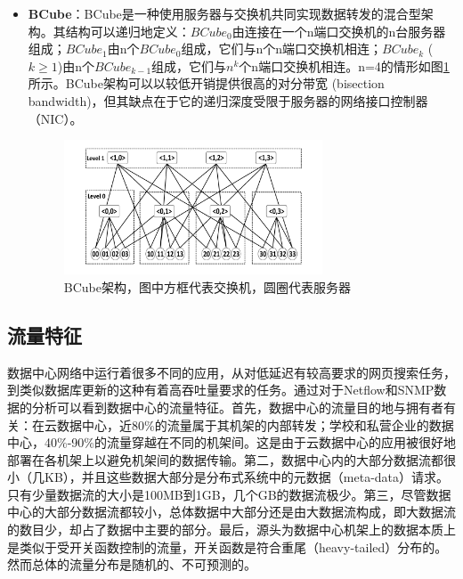 \begin{itemize}
    \item \textbf{BCube}：BCube是一种使用服务器与交换机共同实现数据转发的混合型架构。其结构可以递归地定义：\textit{$BCube_0$}由连接在一个n端口交换机的n台服务器组成；\textit{$BCube_1$}由n个\textit{$BCube_0$}组成，它们与n个n端口交换机相连；\textit{$BCube_k$} ($k \geq 1$)由n个\textit{$BCube_{k-1}$}组成，它们与$n^k$个n端口交换机相连。n=4的情形如图\ref{fig:BCube}所示。BCube架构可以以较低开销提供很高的对分带宽 (bisection bandwidth)，但其缺点在于它的递归深度受限于服务器的网络接口控制器（NIC）。
    \begin{figure}[h]
    \centering
    \includegraphics[height=4cm]{figure/BCube.png}
    \caption{BCube架构，图中方框代表交换机，圆圈代表服务器 \cite{guo2009bcube}}
    \label{fig:BCube}
    \end{figure}
    
\end{itemize}

\subsection{流量特征}
数据中心网络中运行着很多不同的应用，从对低延迟有较高要求的网页搜索任务，到类似数据库更新的这种有着高吞吐量要求的任务。通过对于Netflow\cite{netflow2018}和SNMP\cite{benson2010under,benson2010network,greenberg2009vl2}数据的分析可以看到数据中心的流量特征。首先，数据中心的流量目的地与拥有者有关：在云数据中心，近80\%的流量属于其机架的内部转发；学校和私营企业的数据中心，40\%-90\%的流量穿越在不同的机架间。这是由于云数据中心的应用被很好地部署在各机架上以避免机架间的数据传输。第二，数据中心内的大部分数据流都很小（几KB），并且这些数据大部分是分布式系统中的元数据（meta-data）请求。只有少量数据流的大小是100MB到1GB，几个GB的数据流极少。第三，尽管数据中心的大部分数据流都较小，总体数据中大部分还是由大数据流构成，即大数据流的数目少，却占了数据中主要的部分。最后，源头为数据中心机架上的数据本质上是类似于受开关函数控制的流量，开关函数是符合重尾（heavy-tailed）分布的。然而总体的流量分布是随机的、不可预测的。

